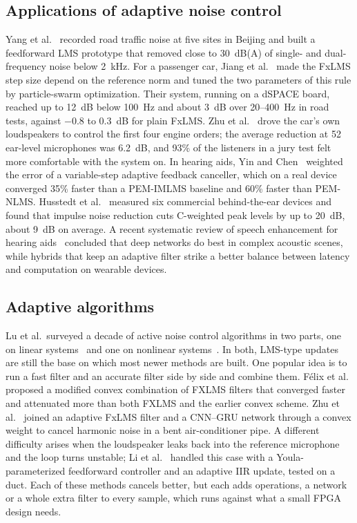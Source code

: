 \subsection{Applications of adaptive noise control}
Yang et al.~\cite{yang2024} recorded road traffic noise at five sites in Beijing and built a feedforward
LMS prototype that removed close to 30~dB(A) of single- and dual-frequency noise below 2~kHz. For a
passenger car, Jiang et al.~\cite{jiang2023} made the FxLMS step size depend on the reference norm and
tuned the two parameters of this rule by particle-swarm optimization. Their system, running on a dSPACE
board, reached up to 12~dB below 100~Hz and about 3~dB over 20--400~Hz in road tests, against $-0.8$ to
0.3~dB for plain FxLMS. Zhu et al.~\cite{zhu2024} drove the car's own loudspeakers to control the first
four engine orders; the average reduction at 52 ear-level microphones was 6.2~dB, and 93\% of the
listeners in a jury test felt more comfortable with the system on. In hearing aids, Yin and
Chen~\cite{yin2023} weighted the error of a variable-step adaptive feedback canceller, which on a real
device converged 35\% faster than a PEM-IMLMS baseline and 60\% faster than PEM-NLMS. Husstedt et
al.~\cite{husstedt2023} measured six commercial behind-the-ear devices and found that impulse noise
reduction cuts C-weighted peak levels by up to 20~dB, about 9~dB on average. A recent systematic review of
speech enhancement for hearing aids~\cite{tetteh2026} concluded that deep networks do best in complex
acoustic scenes, while hybrids that keep an adaptive filter strike a better balance between latency and
computation on wearable devices.

\subsection{Adaptive algorithms}
Lu et al.\ surveyed a decade of active noise control algorithms in two parts, one on linear
systems~\cite{lu2021a} and one on nonlinear systems~\cite{lu2021b}. In both, LMS-type updates are still
the base on which most newer methods are built. One popular idea is to run a fast filter and an accurate
filter side by side and combine them. F\'elix et al.~\cite{felix2021} proposed a modified convex
combination of FXLMS filters that converged faster and attenuated more than both FXLMS and the earlier
convex scheme. Zhu et al.~\cite{zhu2025} joined an adaptive FxLMS filter and a CNN--GRU network through a
convex weight to cancel harmonic noise in a bent air-conditioner pipe. A different difficulty arises when
the loudspeaker leaks back into the reference microphone and the loop turns unstable; Li et
al.~\cite{li2024} handled this case with a Youla-parameterized feedforward controller and an adaptive IIR
update, tested on a duct. Each of these methods cancels better, but each adds operations, a network or a
whole extra filter to every sample, which runs against what a small FPGA design needs.

